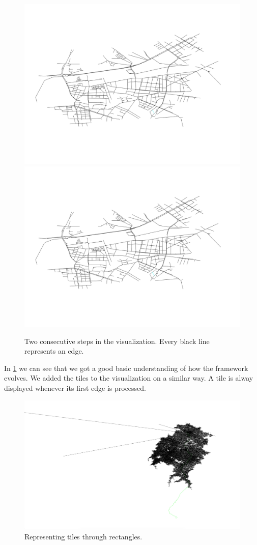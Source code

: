 \documentclass
[
    paper = a4,
    pagesize,
    12 pt,
    oneside,                       %
    open = right,
    DIV = calc,
    BCOR = 0 mm,                   %
    bibtotoc
]
{scrbook}
\begin{document}
\begin{figure}[H]
    \includegraphics[width=.5\textwidth]{Images/vis-step-one.png}
    \includegraphics[width=.5\textwidth]{Images/vis-step-one.png}
\caption[]{Two consecutive steps in the visualization. Every black line represents an edge.}
\label{fig:two-steps}
\end{figure}

In \cref{fig:two-steps} we can see that we got a good basic understanding of how the framework evolves.
We added the tiles to the visualization on a similar way.
A tile is alway displayed whenever its first edge is processed.

\begin{figure}[H]
    \includegraphics[width=\textwidth]{Images/vis-rectangular-tiles.png}
\caption[]{Representing tiles through rectangles.}
\label{fig:rectangle_tiles}
\end{figure}
\end{document}
